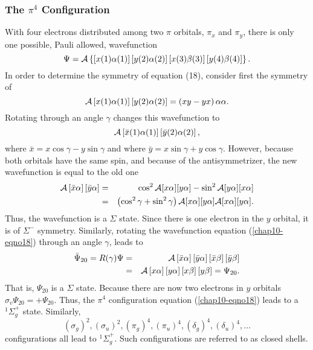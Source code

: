 \subsubsection{The $\pi^4$ Configuration}

With four electrons distributed among two $\pi$ orbitals, $\pi_x$ 
and $\pi_y$, there is only one possible, Pauli allowed, wavefunction
\begin{equation}
\Psi = {\cal A} \left\{ \left[ x (1) \alpha (1) \right] \left[ y (2) 
\alpha (2) \right] \left[ x (3) \beta (3) \right] \left[ y (4) \beta 
(4) \right] \right\}.
\label{chap10-eqno18}
\end{equation}
In order to determine the symmetry of equation (18), consider first the symmetry of
\begin{equation}
{\cal A} \left[ x (1) \alpha (1) \right] \left[ y (2) \alpha (2) 
\right] = \left( xy - yx \right) \alpha \alpha .
\end{equation}
Rotating through an angle $\gamma$ changes this wavefunction to
\begin{equation}
{\cal A} \left[ {\bar{x}} (1) \alpha (1) \right] \left[ {\bar{y}} (2) 
\alpha (2) \right],
\label{chap10-eqno19}
\end{equation}
where ${\bar{x}} = x \cos \gamma - y \sin \gamma$ and where 
${\bar{y}} = x \sin \gamma + y \cos \gamma$.  However, 
because both orbitals have the same spin, and because of the 
antisymmetrizer, the new wavefunction is equal to the old one
\begin{eqnarray}
{\cal A} \left[ {\bar{x}} \alpha \right] \left[ {\bar{y}} \alpha 
\right] &=& \cos^2 {\cal A} [ x \alpha ] [ y \alpha ] - \sin^2 {\cal 
A} [ y \alpha ] [ x \alpha ]\cr
&=& \left( \cos^2 \gamma + \sin^2 \gamma \right) {\cal A} [ x 
\alpha ] [ y \alpha ] {\cal A} [ x \alpha ] [ y \alpha ].
\label{chap10-eqno20}
\end{eqnarray}
Thus, the wavefunction is a $\Sigma$ state. Since there is one electron 
in the $y$ orbital, it is of $\Sigma^-$ symmetry.  Similarly, rotating the 
wavefunction equation (\ref{chap10-eqno18}) through an angle $\gamma$, leads to
\begin{eqnarray}
{\bar{\Psi}}_{20} = R ( \gamma ) \Psi &=& {\cal A} \left[ {\bar{x}} 
\alpha \right] \left[ {\bar{y}} \alpha \right] \left[ {\bar{x}} \beta 
\right] \left[ {\bar{y}} \beta \right]\cr
&=& {\cal A} \left[ x \alpha \right] \left[ y \alpha \right] \left[ x 
\beta \right] \left[ y \beta \right] = \Psi_{20}.
\end{eqnarray}
That is, $\Psi_{20}$ is a $\Sigma$ state.  Because there are now two
electrons in $y$ orbitals $\sigma_v \Psi_{20} = + \Psi_{20}$.  Thus,
the $\pi^4$ configuration equation (\ref{chap10-eqno18}) leads to a
${^1\Sigma}^+_g$ state.  Similarly,
\begin{equation}
\left( \sigma_g \right) ^2 , \left( \sigma_u \right)^2 , \left( 
\pi_g \right)^4 , \left( \pi_u \right)^4 , \left( \delta_g 
\right)^4 , \left( \delta_u \right)^4 , \dots
\end{equation}
configurations all lead to ${^1\Sigma}^+_g$.  Such configurations
are referred to as closed shells.

